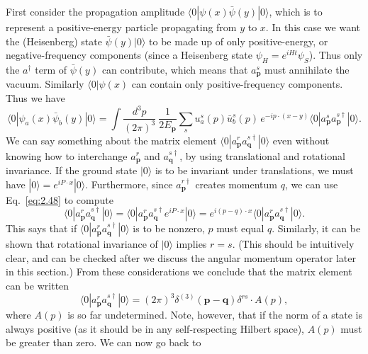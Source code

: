 First consider the propagation amplitude $\langle 0|\psi(x)\bar{\psi}(y)|0\rangle$,
which is to represent a positive-energy particle propagating from $y$ to $x$.
In this case we want the (Heisenberg) state $\bar{\psi}(y)|0\rangle$ to be
made up of only positive-energy, or negative-frequency components (since a
Heisenberg state $\psi_H = e^{iHt}\psi_S$).  Thus only the $a^\dagger$ term
of $\bar{\psi}(y)$ can contribute, which means that $a_{\mathbf{p}}^s$ must
annihilate the vacuum.  Similarly $\langle 0|\psi(x)$ can contain only
positive-frequency components.  Thus we have
\begin{equation}
  \langle 0|\psi_a(x)\bar{\psi}_b(y)|0\rangle
    = \int \frac{d^3p}{(2\pi)^3}\ \frac{1}{2E_{\mathbf{p}}}
    \sum_s u_a^s(p)\bar{u}_b^s(p)\, e^{-ip\cdot(x-y)}
    \langle 0|a_{\mathbf{p}}^s a_{\mathbf{p}}^{s\dagger}|0\rangle .
  \label{eq:3.94}
\end{equation}
We can say something about the matrix element
$\langle 0|a_{\mathbf{p}}^r a_{\mathbf{q}}^{s\dagger}|0\rangle$ even without
knowing how to interchange $a_{\mathbf{p}}^r$ and $a_{\mathbf{q}}^{s\dagger}$,
by using translational and rotational invariance.  If the ground state $|0\rangle$
is to be invariant under translations, we must have
$|0\rangle = e^{iP\cdot x}|0\rangle$.  Furthermore, since $a_{\mathbf{p}}^{r\dagger}$
creates momentum $q$, we can use Eq.~\eqref{eq:2.48} to compute
\begin{equation}
  \langle 0|a_{\mathbf{p}}^r a_{\mathbf{q}}^{s\dagger}|0\rangle
    = \langle 0|a_{\mathbf{p}}^r a_{\mathbf{q}}^{s\dagger}
      e^{iP\cdot x}|0\rangle
    = e^{i(p-q)\cdot x}\langle 0|a_{\mathbf{p}}^r a_{\mathbf{q}}^{s\dagger}|0\rangle .
\end{equation}
This says that if $\langle 0|a_{\mathbf{p}}^r a_{\mathbf{q}}^{s\dagger}|0\rangle$
is to be nonzero, $p$ must equal $q$.  Similarly, it can be shown that
rotational invariance of $|0\rangle$ implies $r = s$.  (This should be
intuitively clear, and can be checked after we discuss the angular momentum
operator later in this section.)  From these considerations we conclude that
the matrix element can be written
\begin{equation}
  \langle 0|a_{\mathbf{p}}^r a_{\mathbf{q}}^{s\dagger}|0\rangle
    = (2\pi)^3\delta^{(3)}(\mathbf{p}-\mathbf{q})\delta^{rs} \cdot A(p),
\end{equation}
where $A(p)$ is so far undetermined.  Note, however, that if the norm of a
state is always positive (as it should be in any self-respecting Hilbert
space), $A(p)$ must be greater than zero.  We can now go back to
